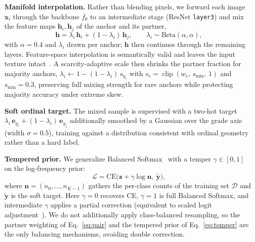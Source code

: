 \documentclass[runningheads]{svproc}
\begin{document}
\textbf{Manifold interpolation.} Rather than blending pixels, we forward each image $\mathbf{x}_i$ through the backbone $f_\theta$ to an intermediate stage (ResNet \texttt{layer3}) and mix the feature maps $\mathbf{h}_i,\mathbf{h}_j$ of the anchor and its partner,
\begin{equation}
\mathbf{h}=\lambda_i\,\mathbf{h}_i+(1-\lambda_i)\,\mathbf{h}_{j},\qquad \lambda_i\sim\text{Beta}(\alpha,\alpha),
\label{eq:manifold}
\end{equation}
with $\alpha=0.4$ and $\lambda_i$ drawn per anchor; $\mathbf{h}$ then continues through the remaining layers. Feature-space interpolation is semantically valid and leaves the input texture intact~\cite{verma2019manifold}. A scarcity-adaptive scale then shrinks the partner fraction for majority anchors, $\lambda_i \leftarrow 1-(1-\lambda_i)\,s_{y_i}$ with $s_c=\operatorname{clip}(w_c,\,s_{\min},\,1)$ and $s_{\min}=0.3$, preserving full mixing strength for rare anchors while protecting majority accuracy under extreme skew.

\textbf{Soft ordinal target.} The mixed sample is supervised with a two-hot target $\lambda_i\,\mathbf{e}_{y_i}+(1-\lambda_i)\,\mathbf{e}_{y_j}$ additionally smoothed by a Gaussian over the grade axis (width $\sigma=0.5$), training against a distribution consistent with ordinal geometry rather than a hard label.

\textbf{Tempered prior.} We generalize Balanced Softmax~\cite{ren2020balanced} with a temper $\gamma\in[0,1]$ on the log-frequency prior:
\begin{equation}
\mathcal{L}=\mathrm{CE}\big(\mathbf{z}+\gamma\log\mathbf{n},\ \tilde{\mathbf{y}}\big),
\label{eq:temper}
\end{equation}
where $\mathbf{n}=(n_0,\dots,n_{K-1})$ gathers the per-class counts of the training set $\mathcal{D}$ and $\tilde{\mathbf{y}}$ is the soft target. Here $\gamma=0$ recovers CE, $\gamma=1$ is full Balanced Softmax, and intermediate $\gamma$ applies a partial correction (equivalent to scaled logit adjustment~\cite{menon2021logit}). We do not additionally apply class-balanced resampling, so the partner weighting of Eq.~\ref{eq:pair} and the tempered prior of Eq.~\ref{eq:temper} are the only balancing mechanisms, avoiding double correction.
\end{document}
